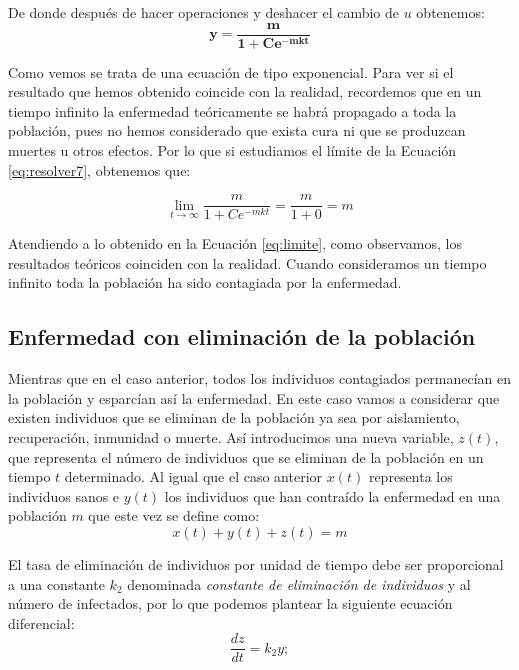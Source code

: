 \documentclass[a4paper,11pt]{article}
\numberwithin{equation}{section}
\begin{document}
\indent De donde después de hacer operaciones y deshacer el cambio de $ u $ obtenemos:
\begin{equation}
\boldsymbol{y=\frac{m}{1+Ce^{-mkt}}}
\label{eq:resolver7}
\end{equation}

\indent Como vemos se trata de una ecuación de tipo exponencial. Para ver si el resultado que hemos obtenido coincide con la realidad, recordemos que en un tiempo infinito la enfermedad teóricamente se habrá propagado a toda la población, pues no hemos considerado que exista cura ni que se produzcan muertes u otros efectos. Por lo que si estudiamos el límite de la Ecuación \ref{eq:resolver7}, obtenemos que:

\begin{equation}
\lim\limits_{t\rightarrow\infty} \frac{m}{1+Ce^{-mkt}} = \frac{m}{1+0}=m
\label{eq:limite}
\end{equation}

\indent Atendiendo a lo obtenido en la Ecuación \ref{eq:limite}, como observamos, los resultados teóricos coinciden con la realidad. Cuando consideramos un tiempo infinito toda la población ha sido contagiada por la enfermedad.

\subsection{Enfermedad con eliminación de la población}

\indent Mientras que en el caso anterior, todos los individuos contagiados permanecían en la población y esparcían así la enfermedad. En este caso vamos a considerar que existen individuos que se eliminan de la población ya sea por aislamiento, recuperación, inmunidad o muerte. Así introducimos una nueva variable,  $ z(t) $, que representa el número de individuos que se eliminan de la población en un tiempo $ t $ determinado. Al igual que el caso anterior $ x(t) $ representa los individuos sanos e $ y(t) $ los individuos que han contraído la enfermedad en una población $ m $ que este vez se define como:
\begin{equation}
x(t)+y(t)+z(t)=m 
\label{eq:pob3}
\end{equation} 

\indent El tasa de eliminación de individuos por unidad de tiempo debe ser proporcional a una constante $ k_2 $ denominada \textit{constante de eliminación de individuos} y al número de infectados, por lo que podemos plantear la siguiente ecuación diferencial:
\begin{equation}
\frac{dz}{dt}=k_2y;
\label{eq:edo1}
\end{equation}
\end{document}
